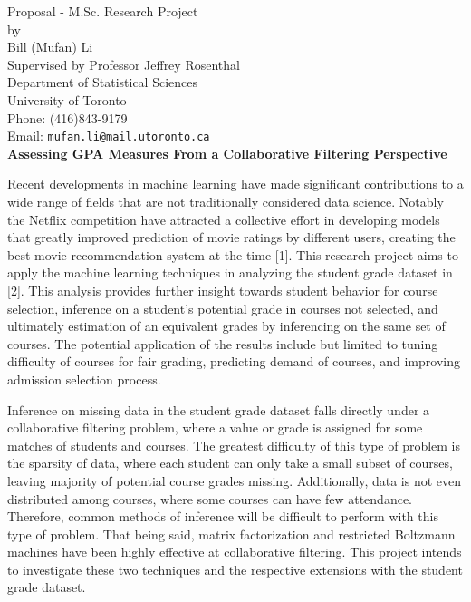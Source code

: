 \documentclass[12pt]{article}
\begin{document}
\begin{center}
Proposal - M.Sc. Research Project \\
by \\
Bill (Mufan) Li \\
Supervised by Professor Jeffrey Rosenthal \\
Department of Statistical Sciences \\
University of Toronto \\
Phone: (416)843-9179\\
Email: {\tt mufan.li@mail.utoronto.ca}\\
\bigskip\large
{\bf Assessing GPA Measures From a Collaborative Filtering
Perspective}
\end{center}

Recent developments in machine learning have made significant 
contributions to a wide range of fields that are not 
traditionally considered data science.
Notably the Netflix competition have attracted a collective
effort in developing models that greatly improved prediction
of movie ratings by different users,
creating the best movie recommendation system at the time [1].
This research project aims to apply the machine learning
techniques in analyzing the student grade dataset in [2].
This analysis provides further insight towards student behavior for
course selection, inference on a student's potential grade
in courses not selected, and ultimately estimation
of an equivalent grades by inferencing on the same set of courses.
The potential application of the results include but limited to
tuning difficulty of courses for fair grading, 
predicting demand of courses,
and improving admission selection process.

Inference on missing data in the
student grade dataset falls directly under a collaborative
filtering problem, where a value or grade is assigned for
some matches of students and courses.
The greatest difficulty of this type of problem is the sparsity
of data, where each student can only take a small subset of 
courses, leaving majority of potential course grades missing.
Additionally, data is not even distributed among courses, 
where some courses can have few attendance.
Therefore, common methods of inference will be difficult
to perform with this type of problem.
That being said, matrix factorization and restricted Boltzmann
machines have been highly effective at collaborative filtering.
This project intends to investigate these two techniques and
the respective extensions with the student grade dataset.
\end{document}
